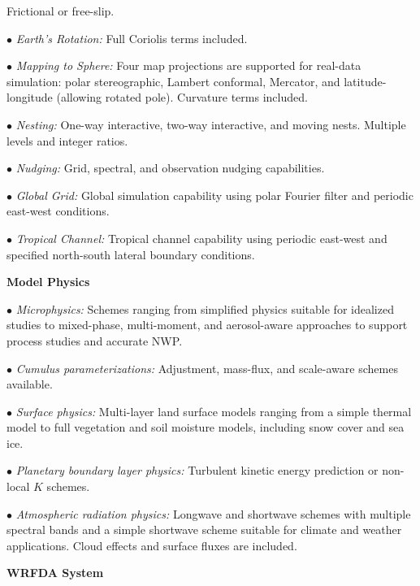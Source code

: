 \begin{description}
Frictional or free-slip.
%
\item{$\bullet$} {\em Earth's Rotation:}
Full Coriolis terms included.
%
\item{$\bullet$} {\em Mapping to Sphere:} 
Four map projections are supported for real-data simulation: 
polar stereographic, Lambert conformal, Mercator, and 
latitude-longitude (allowing rotated pole). 
Curvature terms included.
%
\item{$\bullet$} {\em Nesting:} 
One-way interactive, two-way interactive, and moving nests.
Multiple levels and integer ratios.
%
\item{$\bullet$} {\em Nudging:}
Grid, spectral, and observation nudging capabilities. 
%
\item{$\bullet$} {\em Global Grid:}
Global simulation capability using polar Fourier filter and 
periodic east-west conditions. 
%
\item{$\bullet$} {\em Tropical Channel:}
Tropical channel capability using periodic east-west and specified north-south 
lateral boundary conditions.
\end{description}

\vskip 12pt
{\noindent\bf Model Physics}
\vskip 12pt

\begin{description}
\setlength{\itemsep}{-5pt}
\item{$\bullet$} {\em Microphysics:} Schemes ranging from simplified
physics suitable for idealized studies to mixed-phase, multi-moment, and aerosol-aware
approaches to support process studies and accurate NWP.
%
\item{$\bullet$} {\em Cumulus parameterizations:}
Adjustment, mass-flux, and scale-aware schemes available.
%
\item{$\bullet$} {\em Surface physics:}
Multi-layer land surface models ranging from a simple thermal model to full
vegetation and soil moisture models, including snow cover and sea ice.
%
\item{$\bullet$} {\em Planetary boundary layer physics:}
Turbulent kinetic energy prediction or non-local $K$ schemes.
%
\item{$\bullet$} {\em Atmospheric radiation physics:} 
Longwave and shortwave schemes with multiple spectral bands and a 
simple shortwave scheme suitable for climate and weather applications.  
Cloud effects and surface fluxes are included.
\end{description}

\vskip 12pt
{\noindent\bf WRFDA System}
\vskip 12pt


